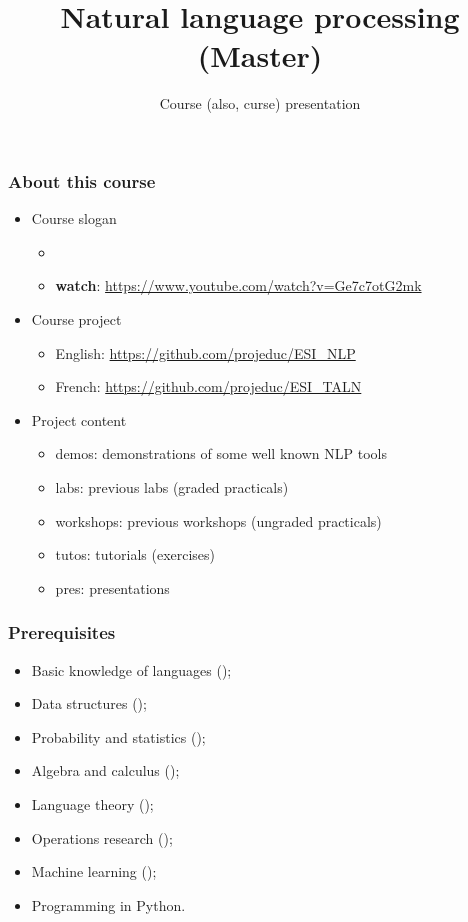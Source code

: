 \documentclass{beamer}
\title[ESI - NLP(master)] %
{Natural language processing (Master)}
\subtitle[Presentation]{Course (also, curse) presentation}
\begin{document}
 
 
 \begin{frame}
 	\frametitle{About this course}
 	
 	\begin{itemize}
 		\item Course slogan
 		\begin{itemize}
 			\item {}
 			\item \textbf{watch}: \url{https://www.youtube.com/watch?v=Ge7c7otG2mk}
 		\end{itemize}
 		\item Course project
 		\begin{itemize}
 			\item English: \url{https://github.com/projeduc/ESI_NLP}
 			\item French: \url{https://github.com/projeduc/ESI_TALN}
 		\end{itemize}
 		\item Project content
 		\begin{itemize}
 			\item demos: demonstrations of some well known NLP tools 
 			\item labs: previous labs (graded practicals)
 			\item workshops: previous workshops (ungraded practicals)
 			\item tutos: tutorials (exercises) 
 			\item pres: presentations
 		\end{itemize}
 	\end{itemize}
 	
 \end{frame}

\begin{frame}
\frametitle{Prerequisites}

\begin{itemize}
	\item Basic knowledge of languages ();
	\item Data structures ();
	\item Probability and statistics ();
	\item Algebra and calculus ();
	\item Language theory ();
	\item Operations research ();
	\item Machine learning ();
	\item Programming in Python.
\end{itemize}

\end{frame}
\end{document}
